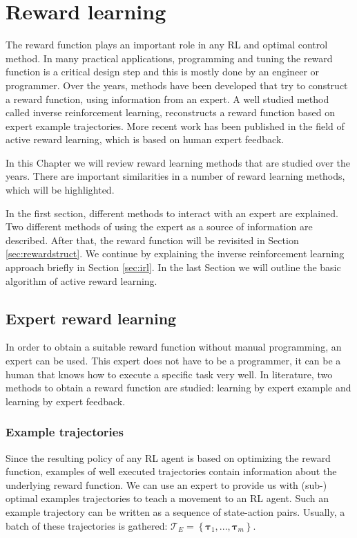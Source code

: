 \documentclass[mscThesis.tex]{subfiles}
\begin{document}
\chapter{Reward learning}
\label{chap:Reward}
The reward function plays an important role in any RL and optimal control method. In many practical applications, programming and tuning the reward function is a critical design step and this is mostly done by an engineer or programmer. Over the years, methods have been developed that try to construct a reward function, using information from an expert. A well studied method called inverse reinforcement learning, reconstructs a reward function based on expert example trajectories. More recent work has been published in the field of active reward learning, which is based on human expert feedback.

In this Chapter we will review reward learning methods that are studied over the years. There are important similarities in a number of reward learning methods, which will be highlighted. 

In the first section, different methods to interact with an expert are explained. Two different  methods of using the expert as a source of information are described. After that, the reward function will be revisited in Section \ref{sec:rewardstruct}. We continue by explaining the inverse reinforcement learning approach briefly in Section \ref{sec:irl}. In the last Section we will outline the basic algorithm of active reward learning.

\section{Expert reward learning}
\label{sec:expert}
In order to obtain a suitable reward function without manual programming, an expert can be used. This expert does not have to be a programmer, it can be a human that knows how to execute a specific task very well. In literature, two methods to obtain a reward function are studied: learning by expert example and learning by expert feedback. 

\subsection{Example trajectories}
\label{ssec:example}
Since the resulting policy of any RL agent is based on optimizing the reward function, examples of well executed trajectories contain information about the underlying reward function. We can use an expert to provide us with (sub-) optimal examples trajectories to teach a movement to an RL agent. Such an example trajectory can be written as a sequence of state-action pairs. Usually, a batch of these trajectories is gathered: $\mathcal{T}_E = \left\{ \bm{\tau}_1, ..., \bm{\tau}_m \right\}$.
\end{document}
